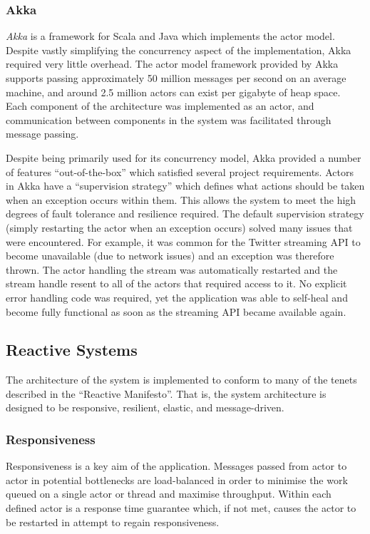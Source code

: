 \documentclass{l4proj}
\begin{document}
\subsubsection{Akka}

    \textit{Akka} is a framework for Scala and Java which implements the actor model. Despite vastly simplifying the concurrency aspect of the implementation, Akka required very little overhead. The actor model framework provided by Akka supports passing approximately 50 million messages per second on an average machine, and around 2.5 million actors can exist per gigabyte of heap space. Each component of the architecture was implemented as an actor, and communication between components in the system was facilitated through message passing.
            
        
        Despite being primarily used for its concurrency model, Akka provided a number of features ``out-of-the-box'' which satisfied several project requirements. Actors in Akka have a ``supervision strategy'' which defines what actions should be taken when an exception occurs within them. This allows the system to meet the high degrees of fault tolerance and resilience required. The default supervision strategy (simply restarting the actor when an exception occurs) solved many issues that were encountered. For example, it was common for the Twitter streaming API to become unavailable (due to network issues) and an exception was therefore thrown. The actor handling the stream was automatically restarted and the stream handle resent to all of the actors that required access to it. No explicit error handling code was required, yet the application was able to self-heal and become fully functional as soon as the streaming API became available again.

        \subsection{Reactive Systems}
        The architecture of the system is implemented to conform to many of the tenets described in the ``Reactive Manifesto''. That is, the system architecture is designed to be responsive, resilient, elastic, and message-driven.
        
            \subsubsection{Responsiveness}
            Responsiveness is a key aim of the application. Messages passed from actor to actor in potential bottlenecks are load-balanced in order to minimise the work queued on a single actor or thread and maximise throughput. Within each defined actor is a response time guarantee which, if not met, causes the actor to be restarted in attempt to regain responsiveness. 
            
\end{document}
